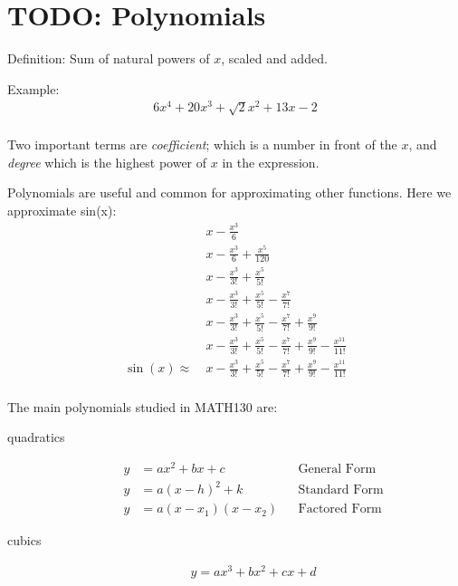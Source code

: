 \chapter{TODO: Polynomials}
\label{chap:Polynomials}
Definition: Sum of natural powers of $x$, scaled and added.

Example:
\begin{align}
  6x^4 + 20x^3 + \sqrt{2}x^2 + 13x - 2 \\
\end{align}

Two important terms are \emph{coefficient}; which is a number in front of the
$x$, and \emph{degree} which is the highest power of $x$ in the expression.

Polynomials are useful and common for approximating other functions. Here we
approximate sin(x):
\begin{align}
  &~ x - \frac{x^{3}}{6} \\
  &~ x - \frac{x^{3}}{6} + \frac{x^5}{120} \\
  &~ x - \frac{x^{3}}{3!} + \frac{x^5}{5!} \\
  &~ x - \frac{x^{3}}{3!} + \frac{x^5}{5!} - \frac{x^7}{7!} \\
  &~ x - \frac{x^{3}}{3!} + \frac{x^5}{5!} - \frac{x^7}{7!} + \frac{x^9}{9!} \\
  &~ x - \frac{x^{3}}{3!} + \frac{x^5}{5!} - \frac{x^7}{7!} + \frac{x^9}{9!} -
  \frac{x^11}{11!} \\
 \sin(x) \approx &~ x - \frac{x^{3}}{3!} + \frac{x^5}{5!} - \frac{x^7}{7!} +
 \frac{x^9}{9!} - \frac{x^11}{11!} \\
\end{align}

The main polynomials studied in MATH130 are:
\begin{description}
  \item[quadratics]
    \begin{align}
      y & = ax^2 + bx + c       && \text{General Form} \\
      y & = a(x - h)^{2} + k    && \text{Standard Form} \\
      y & = a(x - x_1)(x - x_2) && \text{Factored Form}
    \end{align}
  \item[cubics]
    \begin{align}
      y = ax^3 + bx^2 + cx + d
    \end{align}
\end{description}


